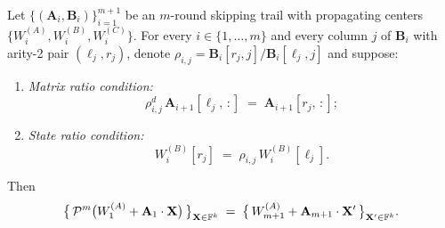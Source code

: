 \documentclass[11pt]{article}
\begin{document}
\begin{theorem}\label{thm:skipping}
    Let $\{(\mathbf{A}_i,\mathbf{B}_i)\}_{i=1}^{m+1}$ be an $m$-round skipping trail
    with propagating centers $\{W_i^{(A)},W_i^{(B)},W_i^{(C)}\}$.
    For every $i\in\{1,\ldots,m\}$ and every column $j$ of $\mathbf{B}_i$
    with arity-2 pair $(\ell_j,r_j)$, denote $\rho_{i,j}=\mathbf{B}_i[r_j,j]/\mathbf{B}_i[\ell_j,j]$
    and suppose:
    \begin{enumerate}[label=(\roman*)]
        \item \emph{Matrix ratio condition:}
        \begin{equation}\label{eq:ratio}
            \rho_{i,j}^d\,\mathbf{A}_{i+1}[\ell_j,\,:]\;=\;\mathbf{A}_{i+1}[r_j,\,:];
        \end{equation}
        \item \emph{State ratio condition:}
        \begin{equation}\label{eq:state-ratio}
            W_i^{(B)}[r_j]\;=\;\rho_{i,j}\,W_i^{(B)}[\ell_j].
        \end{equation}
    \end{enumerate}
    Then
    \begin{equation}\label{eq:skipping2}
        \bigl\{\,\mathcal{P}^m\bigl(W_1^{(A)}+\mathbf{A}_1\cdot\mathbf{X}\bigr)\,\bigr\}_{\mathbf{X}\in\mathbb{F}^k}
        \;=\;
        \bigl\{\,W_{m+1}^{(A)}+\mathbf{A}_{m+1}\cdot\mathbf{X}'\,\bigr\}_{\mathbf{X}'\in\mathbb{F}^k}.
    \end{equation}
\end{theorem}
\end{document}
